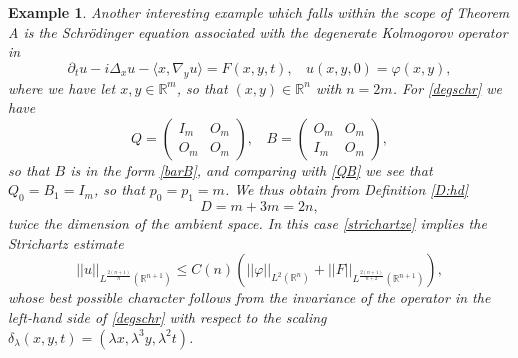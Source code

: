 \documentclass[11pt,letter]{amsart}
\def \R {\mathbb{R}}
\def \vf{\varphi}
\newcommand{\Rn}{\mathbb R^n}
\newcommand{\p}{\partial}
\newcommand{\la}{\lambda}
\numberwithin{equation}{section}
\newcommand{\I}{\mathscr I_{HL}}
\newcommand{\sa}{\langle}
\newcommand{\da}{\rangle}
\newtheorem{example}[theorem]{Example}
\numberwithin{equation}{section}
\begin{document}
\begin{example}\label{E:kolmo} \textnormal{Another interesting example which falls within the scope of Theorem A is the Schr\"odinger equation associated with the degenerate Kolmogorov operator in \cite{Kol}
\begin{equation}\label{degschr}
\p_t u - i \Delta_x u - \sa x,\nabla_y u\da = F(x,y,t),\ \ \ \ u(x,y,0) = \vf(x,y),
\end{equation}
where we have let $x, y\in \R^m$, so that $(x,y)\in \Rn$ with $n = 2m$. For \eqref{degschr} we have 
\[
Q = \begin{pmatrix} I_m & O_m\\ O_m & O_m\end{pmatrix},\ \ \ \  B = \begin{pmatrix} O_m & O_m\\I_m & O_m\end{pmatrix},
\]
so that $B$ is in the form \eqref{barB}, and comparing with \eqref{QB} we see that $Q_0  = B_1 = I_m$, so that $p_0 = p_1 = m$. We thus obtain from Definition \ref{D:hd}
\[
D = m + 3 m = 2n,
\]
twice the dimension of the ambient space. In this case \eqref{strichartze} implies the Strichartz estimate   
\begin{equation}\label{stridegS}
||u||_{L^{\frac{2(n+1)}n}(\R^{n+1})} \le C(n) \left(||\vf||_{L^2(\Rn)} + ||F||_{L^{\frac{2(n+1)}{n+2}}(\R^{n+1})}\right),
\end{equation}
whose best possible character follows from the invariance of the operator in the left-hand side of \eqref{degschr} with respect to the scaling $\delta_\la(x,y,t) = (\la x,\la^3 y, \la^2 t)$.}
\end{example}



\vskip 0.2in
\end{document}
